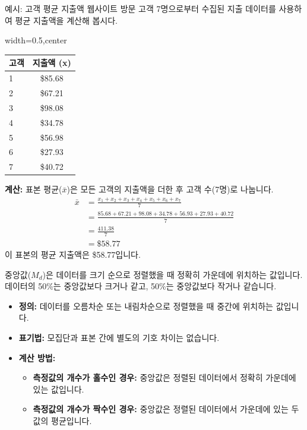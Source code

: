\documentclass[11pt,a4paper]{article}
\begin{document}
\begin{examplebox}{예시: 고객 평균 지출액}
웹사이트 방문 고객 7명으로부터 수집된 지출 데이터를 사용하여 평균 지출액을 계산해 봅시다.

\begin{adjustbox}{width=0.5\textwidth,center}
\begin{tabular}{lc}
\toprule
\textbf{고객} & \textbf{지출액 (x)} \\
\midrule
1 & \$85.68 \\
2 & \$67.21 \\
3 & \$98.08 \\
4 & \$34.78 \\
5 & \$56.98 \\
6 & \$27.93 \\
7 & \$40.72 \\
\bottomrule
\end{tabular}
\end{adjustbox}
\label{tab:customer_spending}

\textbf{계산:}
표본 평균($\bar{x}$)은 모든 고객의 지출액을 더한 후 고객 수(7명)로 나눕니다.
\begin{align*}
    \bar{x} &= \frac{x_1+x_2+x_3+x_4+x_5+x_6+x_7}{7} \\
    &= \frac{85.68 + 67.21 + 98.08 + 34.78 + 56.93 + 27.93 + 40.72}{7} \\
    &= \frac{411.38}{7} \\
    &= \$58.77
\end{align*}
이 표본의 평균 지출액은 \$58.77입니다.
\end{examplebox}

\begin{tcolorbox}[mybox={중앙값 (Median)}]
중앙값($M_d$)은 데이터를 크기 순으로 정렬했을 때 정확히 가운데에 위치하는 값입니다.
데이터의 50\%는 중앙값보다 크거나 같고, 50\%는 중앙값보다 작거나 같습니다.

\begin{itemize}
    \item \textbf{정의:} 데이터를 오름차순 또는 내림차순으로 정렬했을 때 중간에 위치하는 값입니다.
    \item \textbf{표기법:} 모집단과 표본 간에 별도의 기호 차이는 없습니다.
    \item \textbf{계산 방법:}
    \begin{itemize}
        \item \textbf{측정값의 개수가 홀수인 경우:} 중앙값은 정렬된 데이터에서 정확히 가운데에 있는 값입니다.
        \item \textbf{측정값의 개수가 짝수인 경우:} 중앙값은 정렬된 데이터에서 가운데에 있는 두 값의 평균입니다.
    \end{itemize}
\end{itemize}
\end{tcolorbox}
\end{document}
